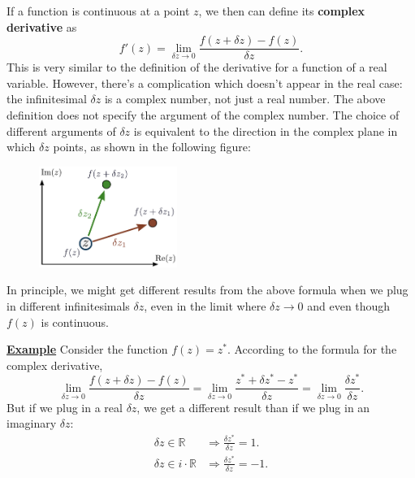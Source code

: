 \documentclass[10pt,a4paper]{article}
\begin{document}
If a function is continuous at a point $z$, we then can define its
\textbf{complex derivative} as
\begin{equation}
  f'(z) = \lim_{\delta z\rightarrow 0} \frac{f(z+\delta z) - f(z)}{\delta z}.
\end{equation}
This is very similar to the definition of the derivative for a
function of a real variable. However, there's a complication which
doesn't appear in the real case: the infinitesimal $\delta z$ is a
complex number, not just a real number. The above definition does not
specify the argument of the complex number.  The choice of different
arguments of $\delta z$ is equivalent to the direction in the complex
plane in which $\delta z$ points, as shown in the following figure:

\begin{figure}[h]
  \centering\includegraphics[width=0.4\textwidth]{complex_derivative}
\end{figure}

\noindent
In principle, we might get different results from the above formula
when we plug in different infinitesimals $\delta z$, even in the limit
where $\delta z \rightarrow 0$ and even though $f(z)$ is continuous.

\begin{framed}
\noindent
\underline{\textbf{Example}}
\vskip 0.1in \noindent
Consider the function $f(z) = z^*$. According to the formula for the
complex derivative,
\begin{equation}
\lim_{\delta z \rightarrow0} \frac{f(z+\delta z) - f(z)}{\delta z} = \lim_{\delta z \rightarrow0} \frac{z^*+\delta z^* - z^*}{\delta z} = \lim_{\delta z \rightarrow0} \frac{\delta z^*}{\delta z}.
\end{equation}But
if we plug in a real $\delta z$, we get a different result than if we
plug in an imaginary
$\delta z$:
\begin{align}
  \delta z \in \mathbb{R} \;\; &\Rightarrow \frac{\delta z^*}{\delta z} = 1.\\
  \delta z \in i \cdot \mathbb{R} &\Rightarrow \frac{\delta z^*}{\delta z} = -1.
\end{align}
\end{framed}
\end{document}
